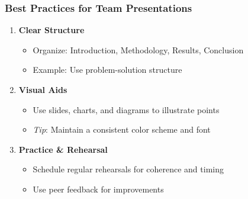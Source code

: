 \documentclass{beamer}
\begin{document}
\begin{frame}[fragile]
    \frametitle{Best Practices for Team Presentations}
    \begin{enumerate}
        \item \textbf{Clear Structure}
            \begin{itemize}
                \item Organize: Introduction, Methodology, Results, Conclusion
                \item Example: Use problem-solution structure
            \end{itemize}
        
        \item \textbf{Visual Aids}
            \begin{itemize}
                \item Use slides, charts, and diagrams to illustrate points
                \item \textit{Tip}: Maintain a consistent color scheme and font
            \end{itemize}

        \item \textbf{Practice \& Rehearsal}
            \begin{itemize}
                \item Schedule regular rehearsals for coherence and timing
                \item Use peer feedback for improvements
            \end{itemize}
    \end{enumerate}
\end{frame}
\end{document}
